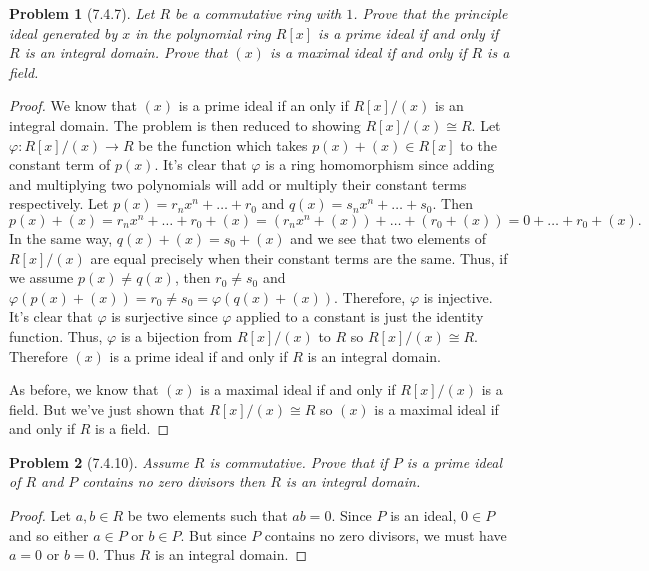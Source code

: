 \documentclass{article}
\newtheorem{problem}{Problem}
\begin{document}
\begin{problem}[7.4.7]
Let $R$ be a commutative ring with $1$. Prove that the principle ideal generated by $x$ in the polynomial ring $R[x]$ is a prime ideal if and only if $R$ is an integral domain. Prove that $(x)$ is a maximal ideal if and only if $R$ is a field.
\end{problem}
\begin{proof}
We know that $(x)$ is a prime ideal if an only if $R[x]/(x)$ is an integral domain. The problem is then reduced to showing $R[x]/(x) \cong R$. Let $\varphi : R[x]/(x) \to R$ be the function which takes $p(x) + (x) \in R[x]$ to the constant term of $p(x)$. It's clear that $\varphi$ is a ring homomorphism since adding and multiplying two polynomials will add or multiply their constant terms respectively. Let $p(x) = r_nx^n + \dots + r_0$ and $q(x) = s_nx^n + \dots + s_0$. Then
\[
p(x) + (x) = r_nx^n + \dots + r_0 + (x) = (r_nx^n + (x)) + \dots + (r_0 + (x)) = 0 + \dots + r_0 + (x).
\]
In the same way, $q(x) + (x) = s_0 + (x)$ and we see that two elements of $R[x]/(x)$ are equal precisely when their constant terms are the same. Thus, if we assume $p(x) \neq q(x)$, then $r_0 \neq s_0$ and $\varphi(p(x) + (x)) = r_0 \neq s_0 = \varphi(q(x) + (x))$. Therefore, $\varphi$ is injective. It's clear that $\varphi$ is surjective since $\varphi$ applied to a constant is just the identity function. Thus, $\varphi$ is a bijection from $R[x]/(x)$ to $R$ so $R[x]/(x) \cong R$. Therefore $(x)$ is a prime ideal if and only if $R$ is an integral domain.

As before, we know that $(x)$ is a maximal ideal if and only if $R[x]/(x)$ is a field. But we've just shown that $R[x]/(x) \cong R$ so $(x)$ is a maximal ideal if and only if $R$ is a field.
\end{proof}

\begin{problem}[7.4.10]
Assume $R$ is commutative. Prove that if $P$ is a prime ideal of $R$ and $P$ contains no zero divisors then $R$ is an integral domain.
\end{problem}
\begin{proof}
Let $a, b \in R$ be two elements such that $ab = 0$. Since $P$ is an ideal, $0 \in P$ and so either $a \in P$ or $b \in P$. But since $P$ contains no zero divisors, we must have $a = 0$ or $b = 0$. Thus $R$ is an integral domain.
\end{proof}
\end{document}
